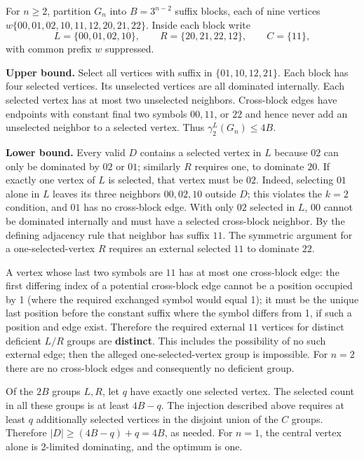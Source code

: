 \documentclass[
  11pt,
]{article}
\begin{document}
For \(n\ge2\), partition \(G_n\) into \(B=3^{n-2}\) suffix blocks, each
of nine vertices \(w\{00,01,02,10,11,12,20,21,22\}\). Inside each block
write \[L=\{00,01,02,10\},\qquad R=\{20,21,22,12\},\qquad C=\{11\},\]
with common prefix \(w\) suppressed.

\textbf{Upper bound.} Select all vertices with suffix in
\(\{01,10,12,21\}\). Each block has four selected vertices. Its
unselected vertices are all dominated internally. Each selected vertex
has at most two unselected neighbors. Cross-block edges have endpoints
with constant final two symbols \(00,11\), or \(22\) and hence never add
an unselected neighbor to a selected vertex. Thus
\(\gamma_2^L(G_n)\le4B\).

\textbf{Lower bound.} Every valid \(D\) contains a selected vertex in
\(L\) because \(02\) can only be dominated by \(02\) or \(01\);
similarly \(R\) requires one, to dominate \(20\). If exactly one vertex
of \(L\) is selected, that vertex must be \(02\). Indeed, selecting
\(01\) alone in \(L\) leaves its three neighbors \(00,02,10\) outside
\(D\); this violates the \(k=2\) condition, and \(01\) has no
cross-block edge. With only \(02\) selected in \(L\), \(00\) cannot be
dominated internally and must have a selected cross-block neighbor. By
the defining adjacency rule that neighbor has suffix \(11\). The
symmetric argument for a one-selected-vertex \(R\) requires an external
selected \(11\) to dominate \(22\).

A vertex whose last two symbols are \(11\) has at most one cross-block
edge: the first differing index of a potential cross-block edge cannot
be a position occupied by 1 (where the required exchanged symbol would
equal 1); it must be the unique last position before the constant suffix
where the symbol differs from 1, if such a position and edge exist.
Therefore the required external \(11\) vertices for distinct deficient
\(L/R\) groups are \textbf{distinct}. This includes the possibility of
no such external edge; then the alleged one-selected-vertex group is
impossible. For \(n=2\) there are no cross-block edges and consequently
no deficient group.

Of the \(2B\) groups \(L,R\), let \(q\) have exactly one selected
vertex. The selected count in all these groups is at least \(4B-q\). The
injection described above requires at least \(q\) additionally selected
vertices in the disjoint union of the \(C\) groups. Therefore
\(|D|\ge(4B-q)+q=4B\), as needed. For \(n=1\), the central vertex alone
is 2-limited dominating, and the optimum is one.
\end{document}
